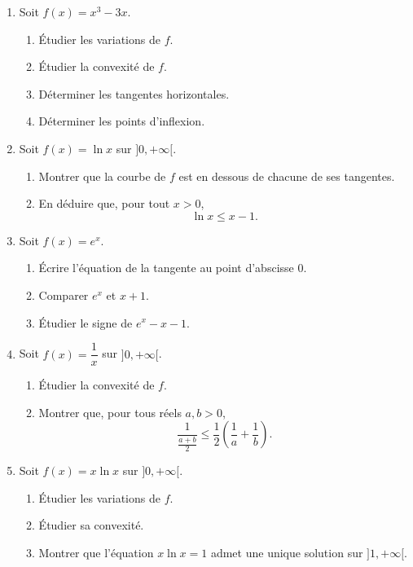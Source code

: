 \documentclass[11pt,a4paper]{article}
\begin{document}
\begin{enumerate}[label=\textbf{Exercice \arabic*.}, leftmargin=*, itemsep=1em]

\item Soit \(f(x)=x^3-3x\).

\begin{enumerate}[label=\alph*)]
    \item Étudier les variations de \(f\).
    \item Étudier la convexité de \(f\).
    \item Déterminer les tangentes horizontales.
    \item Déterminer les points d'inflexion.
\end{enumerate}

\item Soit \(f(x)=\ln x\) sur \(]0,+\infty[\).

\begin{enumerate}[label=\alph*)]
    \item Montrer que la courbe de \(f\) est en dessous de chacune de ses tangentes.
    \item En déduire que, pour tout \(x>0\),
    \[
    \ln x\leq x-1.
    \]
\end{enumerate}

\item Soit \(f(x)=e^x\).

\begin{enumerate}[label=\alph*)]
    \item Écrire l'équation de la tangente au point d'abscisse \(0\).
    \item Comparer \(e^x\) et \(x+1\).
    \item Étudier le signe de \(e^x-x-1\).
\end{enumerate}

\item Soit \(f(x)=\dfrac{1}{x}\) sur \(]0,+\infty[\).

\begin{enumerate}[label=\alph*)]
    \item Étudier la convexité de \(f\).
    \item Montrer que, pour tous réels \(a,b>0\),
    \[
    \frac{1}{\frac{a+b}{2}} \leq \frac12\left(\frac1a+\frac1b\right).
    \]
\end{enumerate}

\item Soit \(f(x)=x\ln x\) sur \(]0,+\infty[\).

\begin{enumerate}[label=\alph*)]
    \item Étudier les variations de \(f\).
    \item Étudier sa convexité.
    \item Montrer que l'équation \(x\ln x=1\) admet une unique solution sur \(]1,+\infty[\).
\end{enumerate}

\end{enumerate}
\end{document}
